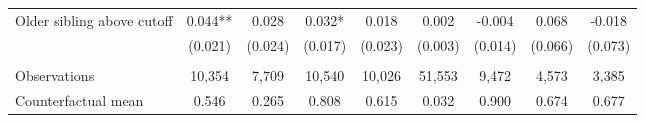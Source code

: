 {{\begin{tabular}{lcccccccc}
Older sibling above cutoff&       0.044** &       0.028   &       0.032*  &       0.018   &       0.002   &      -0.004   &       0.068   &      -0.018   \\
                    &     (0.021)   &     (0.024)   &     (0.017)   &     (0.023)   &     (0.003)   &     (0.014)   &     (0.066)   &     (0.073)   \\
                    &               &               &               &               &               &               &               &               \\
Observations        &      10,354   &       7,709   &      10,540   &      10,026   &      51,553   &       9,472   &       4,573   &       3,385   \\
Counterfactual mean &       0.546   &       0.265   &       0.808   &       0.615   &       0.032   &       0.900   &       0.674   &       0.677   \\
 

\bottomrule
\end{tabular}
}
}
